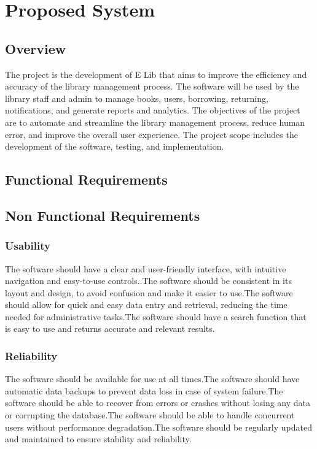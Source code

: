 \chapter{Proposed System}
\section{Overview}
The project is the development of  E Lib that aims to improve the efficiency and accuracy of the library management process. The software will be used by the library staff and admin to manage books, users, borrowing, returning, notifications, and generate reports and analytics. The objectives of the project are to automate and streamline the library management process, reduce human error, and improve the overall user experience. The project scope includes the development of the software, testing, and implementation.

\section{Functional Requirements}



\section{Non Functional Requirements}
\subsection{Usability}
The software should have a clear and user-friendly interface, with intuitive navigation and easy-to-use controls..The software should be consistent in its layout and design, to avoid confusion and make it easier to use.The software should allow for quick and easy data entry and retrieval, reducing the time needed for administrative tasks.The software should have a search function that is easy to use and returns accurate and relevant results.

\subsection{Reliability}
The software should be available for use at all times.The software should have automatic data backups to prevent data loss in case of system failure.The software should be able to recover from errors or crashes without losing any data or corrupting the database.The software should be able to handle concurrent users without performance degradation.The software should be regularly updated and maintained to ensure stability and reliability.

